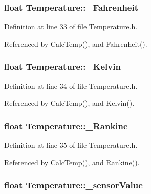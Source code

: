 \hypertarget{class_temperature_a0beb140a271261eb89c3f2fb3bd1f4db}{
\subsubsection[{\-\_\-\-Fahrenheit}]{\setlength{\rightskip}{0pt plus 5cm}float Temperature\-::\-\_\-\-Fahrenheit\hspace{0.3cm}{\ttfamily [private]}}}\label{class_temperature_a0beb140a271261eb89c3f2fb3bd1f4db}


Definition at line 33 of file Temperature.\-h.



Referenced by Calc\-Temp(), and Fahrenheit().

\hypertarget{class_temperature_a832a839960e688420e234a9ccfbc363e}{
\subsubsection[{\-\_\-\-Kelvin}]{\setlength{\rightskip}{0pt plus 5cm}float Temperature\-::\-\_\-\-Kelvin\hspace{0.3cm}{\ttfamily [private]}}}\label{class_temperature_a832a839960e688420e234a9ccfbc363e}


Definition at line 34 of file Temperature.\-h.



Referenced by Calc\-Temp(), and Kelvin().

\hypertarget{class_temperature_a3934bf7760e98ece1f0d1487051e6c6e}{
\subsubsection[{\-\_\-\-Rankine}]{\setlength{\rightskip}{0pt plus 5cm}float Temperature\-::\-\_\-\-Rankine\hspace{0.3cm}{\ttfamily [private]}}}\label{class_temperature_a3934bf7760e98ece1f0d1487051e6c6e}


Definition at line 35 of file Temperature.\-h.



Referenced by Calc\-Temp(), and Rankine().

\hypertarget{class_temperature_a827e297c3c400d55542b6125626e4de1}{
\subsubsection[{\-\_\-sensor\-Value}]{\setlength{\rightskip}{0pt plus 5cm}float Temperature\-::\-\_\-sensor\-Value\hspace{0.3cm}{\ttfamily [private]}}}\label{class_temperature_a827e297c3c400d55542b6125626e4de1}


